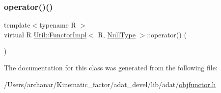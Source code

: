 \subsubsection{\texorpdfstring{operator()()}{operator()()}\hspace{0.1cm}{\footnotesize\ttfamily [2/2]}}
{\footnotesize\ttfamily template$<$typename R $>$ \\
virtual R \mbox{\hyperlink{classUtil_1_1FunctorImpl}{Util\+::\+Functor\+Impl}}$<$ R, \mbox{\hyperlink{classUtil_1_1NullType}{Null\+Type}} $>$\+::operator() (\begin{DoxyParamCaption}{ }\end{DoxyParamCaption})\hspace{0.3cm}{\ttfamily [pure virtual]}}



The documentation for this class was generated from the following file\+:\begin{DoxyCompactItemize}
\item 
/\+Users/archanar/\+Kinematic\+\_\+factor/adat\+\_\+devel/lib/adat/\mbox{\hyperlink{lib_2adat_2objfunctor_8h}{objfunctor.\+h}}\end{DoxyCompactItemize}
